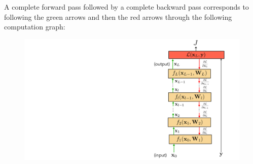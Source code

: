 \newpage
A complete forward pass followed by a complete backward pass corresponds to following the green arrows and then the red arrows through the following computation graph:
\begin{figure}[h!]
    \centering
    \includegraphics[width=0.45\linewidth]{./figures/backpropagation/backprop_through_multiple_layers.pdf}
    \label{fig:backprop_through_multiple_layers}
\end{figure}





